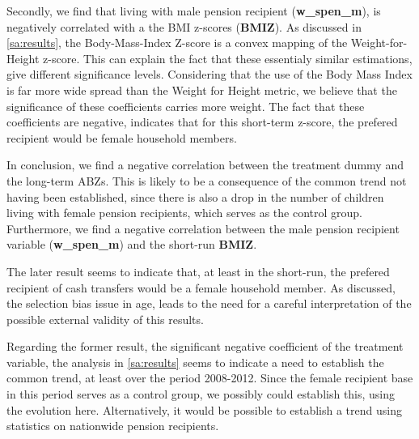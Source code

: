 \begin{refsection}
Secondly, we find that living with male pension recipient (\textbf{w\_spen\_m}),
is negatively correlated with a the BMI z-scores (\textbf{BMIZ}).
As discussed in \autoref{sa:results}, the Body-Mass-Index Z-score is a convex mapping of the Weight-for-Height z-score.
This can explain the fact that these essentialy similar estimations, give different significance levels.
Considering that the use of the Body Mass Index is far more wide spread than the Weight for Height metric,
we believe that the significance of these coefficients carries more weight.
The fact that these coefficients are negative, indicates that for this short-term z-score,
the prefered recipient would be female household members.

In conclusion, we find a negative correlation between the treatment dummy and the long-term ABZs.
This is likely to be a consequence of the common trend not having been established,
since there is also a drop in the number of children living with female pension recipients, which serves as the control group.
Furthermore, we find a negative correlation between the male pension recipient variable (\textbf{w\_spen\_m}) and the short-run \textbf{BMIZ}.

The later result seems to indicate that, at least in the short-run,
the prefered recipient of cash transfers would be a female household member.
As discussed, the selection bias issue in age,
leads to the need for a careful interpretation of the possible external validity of this results.

Regarding the former result, the significant negative coefficient of the treatment variable,
the analysis in \autoref{sa:results} seems to indicate a need to establish the common trend,
at least over the period 2008-2012.
Since the female recipient base in this period serves as a control group, we possibly could establish this, using the evolution here.
Alternatively, it would be possible to establish a trend using statistics on nationwide pension recipients.



\printbibliography
\end{refsection}